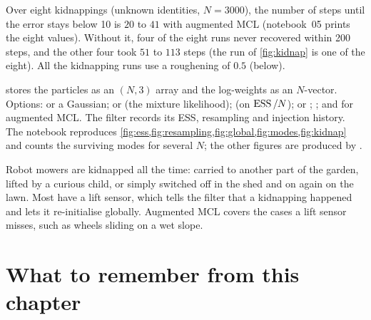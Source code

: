 Over eight kidnappings (unknown identities, $N=3000$), the number of
steps until the error stays below 10 is $20$ to $41$ with augmented MCL
(notebook~05 prints the eight values).
Without it, four of the eight runs never recovered within 200 steps, and
the other four took $51$ to $113$ steps (the run of \cref{fig:kidnap} is
one of the eight). All the kidnapping runs use a roughening of $0.5$
(below).

\begin{practice}
 stores the particles as an $(N,3)$ array and the
log-weights as an $N$-vector. Options:  or a Gaussian;
 or  (the mixture likelihood);
 (on $\operatorname{ESS}/N$);  or
; ; and
 for augmented MCL. The filter
records its ESS, resampling and injection history. The notebook reproduces
\cref{fig:ess,fig:resampling,fig:global,fig:modes,fig:kidnap} and counts
the surviving modes for several $N$; the other figures are produced by
.
\end{practice}

\begin{mower}
Robot mowers are kidnapped all the time: carried to another part of the
garden, lifted by a curious child, or simply switched off in the shed and
on again on the lawn. Most have a lift sensor, which tells the filter that
a kidnapping happened and lets it re-initialise globally. Augmented MCL
covers the cases a lift sensor misses, such as wheels sliding on a wet
slope.
\end{mower}

\section*{What to remember from this chapter}

